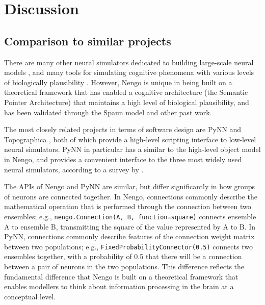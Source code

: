 \documentclass{frontiersSCNS}
\begin{document}
\section{Discussion}

\subsection{Comparison to similar projects}

There are many other neural simulators
dedicated to building large-scale neural models
\citep{eppler2008,goodman2009,hines2009},
and many tools for simulating cognitive phenomena
with various levels of biologically plausibility
\citep{cooper1998,sun2001,anderson2004,franklin2007,
  aisa2008,dekamps2008,laird2012}.
However, Nengo is unique in being built
on a theoretical framework
that has enabled a cognitive architecture
(the Semantic Pointer Architecture)
that maintains a high level
of biological plausibility,
and has been validated
through the Spaun model and other past work.

The most closely related projects
in terms of software design
are PyNN \citep{davison2008}
and Topographica \citep{bednar2009},
both of which provide a high-level scripting
interface to low-level neural simulators.
PyNN in particular has a similar to the
high-level object model in Nengo,
and provides a convenient interface
to the three most widely used
neural simulators, according
to a survey by \citet{hanke2011}.

The APIs of Nengo and PyNN are similar,
but differ significantly
in how groups of neurons are connected together.
In Nengo, connections commonly describe
the mathematical operation that is performed
through the connection between
two ensembles;
e.g., \texttt{nengo.Connection(A, B,
function=square)} connects ensemble A
to ensemble B, transmitting the square of
the value represented by A to B.
In PyNN, connections commonly describe
features of the connection weight matrix
between two populations;
e.g., \texttt{FixedProbabilityConnector(0.5)}
connects two ensembles together,
with a probability of 0.5
that there will be a connection
between a pair of neurons in the two populations.
This difference reflects the
fundamental difference that Nengo
is built on a theoretical framework
that enables modellers to think
about information processing in the brain
at a conceptual level.
\end{document}
